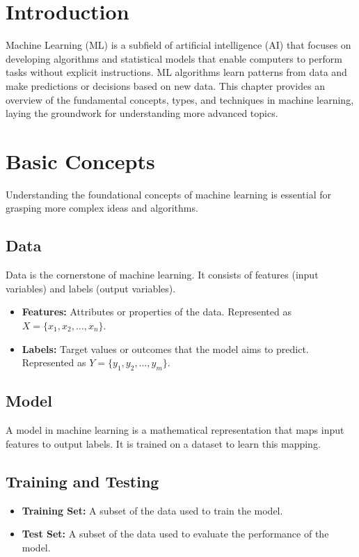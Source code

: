 \section{Introduction}
Machine Learning (ML) is a subfield of artificial intelligence (AI) that focuses on developing algorithms and statistical models that enable computers to perform tasks without explicit instructions. ML algorithms learn patterns from data and make predictions or decisions based on new data. This chapter provides an overview of the fundamental concepts, types, and techniques in machine learning, laying the groundwork for understanding more advanced topics.

\section{Basic Concepts}
Understanding the foundational concepts of machine learning is essential for grasping more complex ideas and algorithms.

\subsection{Data}
Data is the cornerstone of machine learning. It consists of features (input variables) and labels (output variables).

\begin{itemize}
    \item \textbf{Features:} Attributes or properties of the data. Represented as \( X = \{x_1, x_2, \ldots, x_n\} \).
    \item \textbf{Labels:} Target values or outcomes that the model aims to predict. Represented as \( Y = \{y_1, y_2, \ldots, y_m\} \).
\end{itemize}

\subsection{Model}
A model in machine learning is a mathematical representation that maps input features to output labels. It is trained on a dataset to learn this mapping.

\subsection{Training and Testing}
\begin{itemize}
    \item \textbf{Training Set:} A subset of the data used to train the model.
    \item \textbf{Test Set:} A subset of the data used to evaluate the performance of the model.
\end{itemize}

